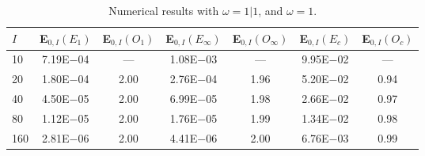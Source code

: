 \begin{table}[H]
\caption{Numerical results with $\omega=1|1$, and $\omega=1$.}
\setlength{\tabcolsep}{5pt}
\centering
\begin{tabular}{@{}l c c c c c c@{}}
\toprule
$I$ & E$_{0,I}(E_{1})$ & E$_{0,I}(O_{1})$ &
E$_{0,I}(E_{\infty})$ & E$_{0,I}(O_{\infty})$ & 
E$_{0,I}(E_{c})$ & E$_{0,I}(O_{c})$\\
\midrule
10  & 7.19E$-$04 & ---  & 1.08E$-$03 & ---  & 9.95E$-$02 & --- \\
20  & 1.80E$-$04 & 2.00 & 2.76E$-$04 & 1.96 & 5.20E$-$02 & 0.94\\
40  & 4.50E$-$05 & 2.00 & 6.99E$-$05 & 1.98 & 2.66E$-$02 & 0.97\\
80  & 1.12E$-$05 & 2.00 & 1.76E$-$05 & 1.99 & 1.34E$-$02 & 0.98\\
160 & 2.81E$-$06 & 2.00 & 4.41E$-$06 & 2.00 & 6.76E$-$03 & 0.99\\
\bottomrule
\end{tabular}
\end{table}
